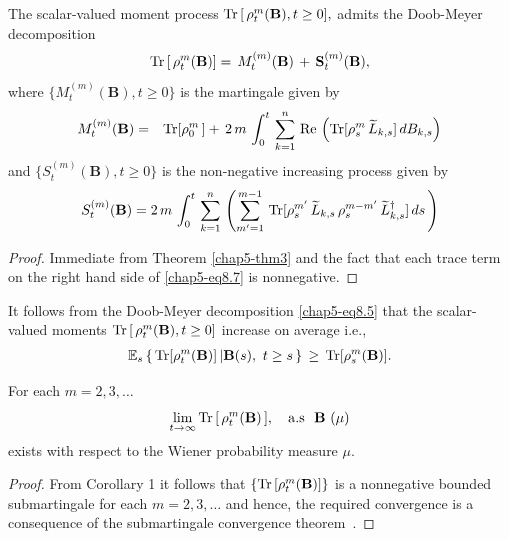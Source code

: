 \setcounter{coro}{0}
\begin{coro}
The scalar-valued moment process ${\rm Tr}\,[\, \rho_t^m(\mathbf{B}), t\geq 0],$ admits the Doob-Meyer decomposition~\cite{key39, key40} 
\begin{equation} 
{\rm Tr}\,[\, \rho_t^m(\mathbf{B})]=\, M^{(m)}_t(\mathbf{B}) \, +\, \mathbf{S}^{(m)}_t(\mathbf{B}),\label{chap5-eq8.5}
\end{equation}
where $\{M^{(m)}_t(\mathbf{B}), t\geq 0\}$  is the martingale given by 
\begin{eqnarray} 
M^{(m)}_t(\mathbf{B}) &=& {\rm Tr}[\rho_0^m\,]+\, 2\,m\, \int_{0}^{t}\,  \sum_{k=1}^n\, {\rm Re}\,\left({\rm Tr}[\rho_s^m\, \widetilde{L}_{k,s}]\, dB_{k,s}\right)\label{chap5-eq8.6}
\end{eqnarray}
and $\{S^{(m)}_t(\mathbf{B}), t\geq 0\}$ is the non-negative increasing process given by 
\begin{eqnarray}
S^{(m)}_t(\mathbf{B}) = 2\, m\, \int_{0}^{t}\,  \sum_{k=1}^n\, \left(\sum_{m'=1}^{m-1}\, {\rm Tr}[\rho_s^{m'}\, \widetilde{L}_{k,s}\, \rho_s^{m-m'}\, \widetilde{L}_{k,s}^\dag]\, ds\, \right) \label{chap5-eq8.7}
\end{eqnarray}
\end{coro}
\begin{proof}
Immediate from Theorem \ref{chap5-thm3}  and the fact that each trace term on the right hand side of \eqref{chap5-eq8.7} is nonnegative. 
\end{proof}
\begin{remark}
It follows from the Doob-Meyer decomposition \eqref{chap5-eq8.5}  that the scalar-valued moments ${\rm Tr}\,[\, \rho_t^m(\mathbf{B}), t\geq 0]$  increase on average i.e., 
\begin{eqnarray}
\mathbb{E}_s\left\{\, {\rm Tr}[\rho^m_t(\mathbf{B})]\, \vert \mathbf{B}(s),\ t\geq s\, \right\}\, \geq\, 
{\rm Tr}[\rho^m_s(\mathbf{B})]. \label{chap5-eq8.8}
\end{eqnarray}
\end{remark}

\begin{coro} %
For each $m=2,3,\ldots $ 
$$
\underset{t\rightarrow\infty}{\lim}\, {\rm Tr}\, [\,\rho_t^m(\mathbf{B})\,], \ \ \ {\rm a.s} \ \ \mathbf{B}\ (\mu)
$$ 
exists with respect to the Wiener probability measure $\mu$. 
\end{coro}

\begin{proof}
From Corollary 1 it follows that $\{{\rm Tr}\,[\rho_t^m(\mathbf{B})]\}$ is a nonnegative bounded submartingale for each $m=2,3,\ldots$ and hence, the required convergence  is a consequence of the submartingale convergence theorem~\cite{key39, key40}.
\end{proof}

